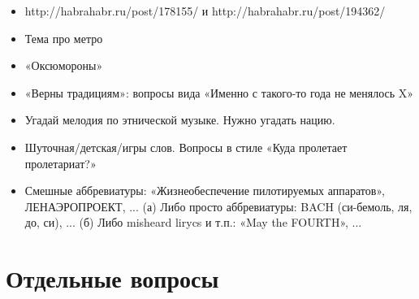 \documentclass[a4paper,10pt]{article}
\begin{document}
\begin{itemize}
 \item http://habrahabr.ru/post/178155/ и http://habrahabr.ru/post/194362/
 \item Тема про метро
 \item «Оксюмороны»
 \item «Верны традициям»: вопросы вида «Именно с такого-то года не менялось X»
 \item Угадай мелодия по этнической музыке. Нужно угадать нацию.
 \item Шуточная/детская/игры слов. Вопросы в стиле «Куда пролетает пролетариат?»
 \item Смешные аббревиатуры: «Жизнеобеспечение пилотируемых аппаратов», ЛЕНАЭРОПРОЕКТ, ...
       (а) Либо просто аббревиатуры: BACH (си-бемоль, ля, до, си), ...
       (б) Либо misheard lirycs и т.п.: «May the FOURTH», ...
\end{itemize}


\section{Отдельные вопросы}
\end{document}
